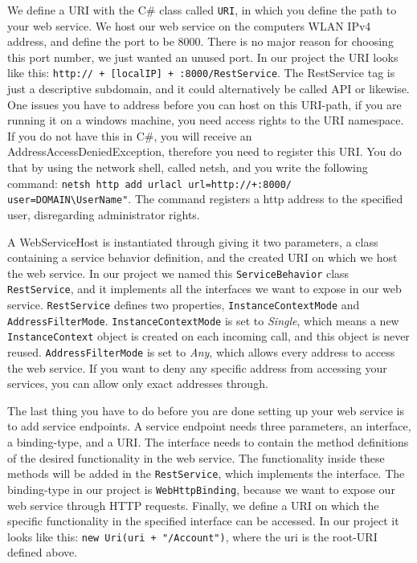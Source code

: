 We define a URI with the C\# class called \texttt{URI}\cite{URIclass}, in which you define the path to your web service. We host our web service on the computers WLAN IPv4 address, and define the port to be 8000. There is no major reason for choosing this port number, we just wanted an unused port. In our project the URI looks like this: \texttt{http:// + [localIP] + :8000/RestService}. The RestService tag is just a descriptive subdomain, and it could alternatively be called API or likewise. One issues you have to address before you can host on this URI-path, if you are running it on a windows machine, you need access rights to the URI namespace. If you do not have this in C\#, you will receive an AddressAccessDeniedException, therefore you need to register this URI. You do that by using the network shell, called netsh, and you write the following command: \texttt{netsh http add urlacl url=http://+:8000/ user=DOMAIN\textbackslash UserName"}. The command registers a http address to the specified user, disregarding administrator rights\cite{netshURI}.

A WebServiceHost is instantiated through giving it two parameters, a class containing a service behavior definition, and the created URI on which we host the web service. In our project we named this \texttt{ServiceBehavior}\cite{ServiceBehavior} class \texttt{RestService}, and it implements all the interfaces we want to expose in our web service. \texttt{RestService} defines two properties, \texttt{InstanceContextMode}\cite{InstanceCtxMode} and \texttt{AddressFilterMode}\cite{AddressFilterMode}. \texttt{InstanceContextMode} is set to \textit{Single}, which means a new \texttt{InstanceContext} object is created on each incoming call, and this object is never reused. \texttt{AddressFilterMode} is set to \textit{Any}, which allows every address to access the web service. If you want to deny any specific address from accessing your services, you can allow only exact addresses through. 

The last thing you have to do before you are done setting up your web service is to add service endpoints. A service endpoint needs three parameters, an interface, a binding-type, and a URI. The interface needs to contain the method definitions of the desired functionality in the web service. The functionality inside these methods will be added in the \texttt{RestService}, which implements the interface. The binding-type in our project is \texttt{WebHttpBinding}\cite{WebHttpBinding}, because we want to expose our web service through HTTP requests. Finally, we define a URI on which the specific functionality in the specified interface can be accessed. In our project it looks like this: \texttt{new Uri(uri + "/Account")}, where the uri is the root-URI defined above.

